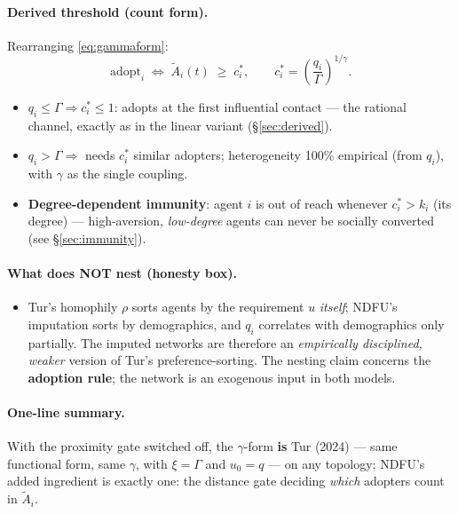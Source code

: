\documentclass[11pt,a4paper]{article}
\newcommand{\Acount}{\tilde{A}}             %
\begin{document}
\paragraph{Derived threshold (count form).} Rearranging \eqref{eq:gammaform}:
\begin{equation}
  \text{adopt}_i \;\iff\; \Acount_i(t) \;\ge\; c_i^{*},
  \qquad
  c_i^{*} = \left(\frac{q_i}{\Gamma}\right)^{1/\gamma}.
  \label{eq:cstar}
\end{equation}

\begin{itemize}
  \item $q_i \le \Gamma \Rightarrow c_i^{*} \le 1$: adopts at the first influential
    contact --- the rational channel, exactly as in the linear variant
    (\S\ref{sec:derived}).
  \item $q_i > \Gamma \Rightarrow$ needs $c_i^{*}$ similar adopters; heterogeneity 100\%
    empirical (from $q_i$), with $\gamma$ as the single coupling.
  \item \textbf{Degree-dependent immunity}: agent $i$ is out of reach whenever
    $c_i^{*} > k_i$ (its degree) --- high-aversion, \emph{low-degree} agents can never be
    socially converted (see \S\ref{sec:immunity}).
\end{itemize}

\paragraph{What does NOT nest (honesty box).}
\begin{itemize}
  \item Tur's homophily $\rho$ sorts agents by the requirement $u$ \emph{itself}; NDFU's
    imputation sorts by demographics, and $q_i$ correlates with demographics only
    partially. The imputed networks are therefore an \emph{empirically disciplined,
    weaker} version of Tur's preference-sorting. The nesting claim concerns the
    \textbf{adoption rule}; the network is an exogenous input in both models.
\end{itemize}

\paragraph{One-line summary.} With the proximity gate switched off, the $\gamma$-form
\textbf{is} Tur (2024) --- same functional form, same $\gamma$, with $\xi = \Gamma$ and
$u_0 = q$ --- on any topology; NDFU's added ingredient is exactly one: the distance gate
deciding \emph{which} adopters count in $\Acount_i$.
\end{document}
